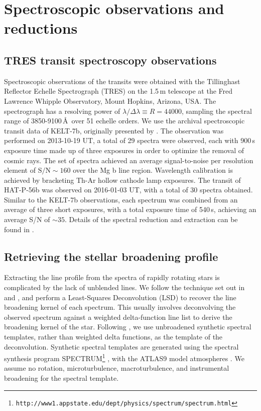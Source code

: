 \documentclass[useAMS,usenatbib]{mn2e}
\begin{document}
\section{Spectroscopic observations and reductions}
\label{sec:obs_and_analyses}

\subsection{TRES transit spectroscopy observations}
\label{sec:tres}

Spectroscopic observations of the transits were obtained with the Tillinghast Reflector Echelle Spectrograph (TRES) on the 1.5\,m telescope at the Fred Lawrence Whipple Observatory, Mount Hopkins, Arizona, USA. The spectrograph has a resolving power of $\lambda / \Delta \lambda \equiv R = 44000$, sampling the spectral range of 3850-9100\,\AA\, over 51 echelle orders. We use the archival spectroscopic transit data of KELT-7b, originally presented by \citet{2015AJ....150...12B}. The observation was performed on 2013-10-19 UT, a total of 29 spectra were observed, each with 900\,s exposure time made up of three exposures in order to optimize the removal of cosmic rays. The set of spectra achieved an average signal-to-noise per resolution element of $\text{S/N} \sim 160$ over the Mg b line region. Wavelength calibration is achieved by bracketing Th-Ar hollow cathode lamp exposures. The transit of HAT-P-56b was observed on 2016-01-03 UT, with a total of 30 spectra obtained. Similar to the KELT-7b observations, each spectrum was combined from an average of three short exposures, with a total exposure time of 540\,s, achieving an average S/N of $\sim35$. Details of the spectral reduction and extraction can be found in \citet{2010ApJ...720.1118B}.

\subsection{Retrieving the stellar broadening profile}
\label{sec:lsd}

Extracting the line profile from the spectra of rapidly rotating stars is complicated by the lack of unblended lines. We follow the technique set out in \citet{1997MNRAS.291..658D} and \citet{2010MNRAS.403..151C}, and perform a Least-Squares Deconvolution (LSD) to recover the line broadening kernel of each spectrum. This usually involves deconvolving the observed spectrum against a weighted delta-function line list to derive the broadening kernel of the star. Following \citet{2015AJ....150..197H}, we use unbroadened synthetic spectral templates, rather than weighted delta functions, as the template of the deconvolution. Synthetic spectral templates are generated using the spectral synthesis program SPECTRUM\footnote{\texttt{http://www1.appstate.edu/dept/physics/spectrum/spectrum.html}} \citep{1994AJ....107..742G}, with the ATLAS9 model atmospheres \citep{2004astro.ph..5087C}. We assume no rotation, microturbulence, macroturbulence, and instrumental broadening for the spectral template. 
\end{document}
